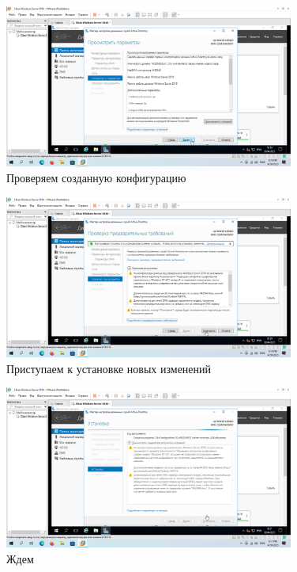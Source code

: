 \documentclass[a4paper]{article}
\begin{document}
  \begin{figure}[H]
    \centering
    \includegraphics[width=0.85\textwidth]{Screenshot_57}
    \caption{Проверяем созданную конфигурацию}
    \label{img:57}
  \end{figure}

  \begin{figure}[H]
    \centering
    \includegraphics[width=0.85\textwidth]{Screenshot_58}
    \caption{Приступаем к установке новых изменений}
    \label{img:58}
  \end{figure}

  \begin{figure}[H]
    \centering
    \includegraphics[width=0.85\textwidth]{Screenshot_59}
    \caption{Ждем}
    \label{img:59}
  \end{figure}
\end{document}
